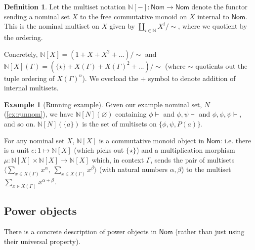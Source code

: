 \documentclass{article}
\theoremstyle{definition}
\newtheorem{definition}{Definition}[section]
\newtheorem{example}{Example}[section]
\newcommand{\N}{\mathbb{N}}
\newcommand{\cat}[1]{\mathsf{#1}}
\newcommand{\Nom}{\cat{Nom}}
\begin{document}


\begin{definition}
    Let the multiset notation $\N[-]\colon \Nom\to\Nom$ denote the functor sending a nominal set $X$ to the free commutative monoid on $X$ internal to $\Nom$. 
    This is the nominal multiset on $X$ given by $\amalg_{i \in \N} X^i/\sim$, where we quotient by the ordering.

\end{definition}

Concretely, $\N[X] = (1 + X + X^2+...)/\sim$ and $\N[X](\Gamma) = (\{\star\}+X(\Gamma)+X(\Gamma)^2+...)/\sim$ (where $\sim$ quotients out the tuple ordering of $X(\Gamma)^n$). 
We overload the $+$ symbol to denote addition of internal multisets. 

\begin{example}[Running example]
    Given our example nominal set, $N$ (\cref{ex:runnom}), we have $\N[N](\varnothing)$ containing $\phi \vdash $ and $\phi,\psi \vdash$ and $\phi,\phi,\psi\vdash$, and so on. 
    $\N[N](\{a\})$ is the set of multisets on $\{\phi,\psi, P(a)\}$.
\end{example}

For any nominal set $X$, $\N[X]$ is a commutative monoid object in $\Nom$: i.e. there is a unit $e\colon 1\mapsto \N[X]$ (which picks out $\{\star\}$) and a multiplication morphism $\mu\colon \N[X]\times \N[X] \to \N[X]$ which, in context $\Gamma$, sends the pair of multisets $\langle \sum_{x \in X(\Gamma)} x^\alpha,\  \sum_{x \in X(\Gamma)} x^\beta\rangle $ (with natural numbers $\alpha,\beta$) to the multiset $\sum_{x \in X(\Gamma)} x^{\alpha+\beta}$. 


\subsection*{Power objects}

There is a concrete description of power objects in $\Nom$ (rather than just using their universal property).
\end{document}

